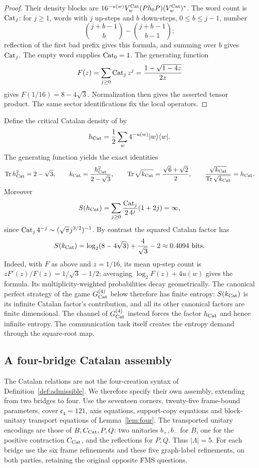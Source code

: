 \begin{proof}
Their density blocks are $16^{-u(w)}V_w^{\rm Cat}(Ph_0P)(V_w^{\rm Cat})^*$. The word count is $\operatorname{Cat}_j$: for $j\geq1$, words with $j$ up-steps and $b$ down-steps, $0\leq b\leq j-1$, number
\[
 \binom{j+b-1}{b}-\binom{j+b-1}{b-1};
\]
reflection of the first bad prefix gives this formula, and summing over $b$ gives $\operatorname{Cat}_j$. The empty word supplies $\operatorname{Cat}_0=1$. The generating function
\[
 F(z)=\sum_{j\geq0}\operatorname{Cat}_jz^j=\frac{1-\sqrt{1-4z}}{2z}
\]
gives $F(1/16)=8-4\sqrt3$. Normalization then gives the asserted tensor product. The same sector identifications fix the local operators.
\end{proof}

Define the critical Catalan density of \cite{Entropy} by
\[
 h_{\mathrm{Cat}}=\frac12\sum_w4^{-u(w)}|w\rangle\langle w|.
\]
The generating function yields the exact identities
\begin{equation}\label{eq:Catnumbers}
 \operatorname{Tr}h_{\mathrm{Cat}}^2=2-\sqrt3,\qquad
 k_{\mathrm{Cat}}=\frac{h_{\mathrm{Cat}}^2}{2-\sqrt3},\qquad
 \operatorname{Tr}\sqrt{k_{\mathrm{Cat}}}=\frac{\sqrt6+\sqrt2}{2},\qquad
 \frac{\sqrt{k_{\mathrm{Cat}}}}{\operatorname{Tr}\sqrt{k_{\mathrm{Cat}}}}=h_{\mathrm{Cat}}.
\end{equation}
Moreover
\begin{equation}\label{eq:Catentropy}
 S(h_{\mathrm{Cat}})=\sum_{j\geq0}\frac{\operatorname{Cat}_j}{2\,4^j}(1+2j)=\infty,
\end{equation}
since $\operatorname{Cat}_j4^{-j}\sim(\sqrt\pi j^{3/2})^{-1}$. By contrast the squared Catalan factor has
\[
 S(k_{\mathrm{Cat}})=\log_2(8-4\sqrt3)+\frac4{\sqrt3}-2
 \approx0.4094\ \text{bits}.
\]
Indeed, with $F$ as above and $z=1/16$, its mean up-step count is $zF'(z)/F(z)=1/\sqrt3-1/2$; averaging $\log_2 F(z)+4u(w)$ gives the formula. Its multiplicity-weighted probabilities decay geometrically. The canonical perfect strategy of the game $G^{(4)}_{\operatorname{Cat}}$ below therefore has finite entropy: $S(k_{\mathrm{Cat}})$ is its infinite Catalan factor's contribution, and all its other canonical factors are finite dimensional. The channel of $G^{(4)}_{\operatorname{Cat}}$ instead forces the factor $h_{\mathrm{Cat}}$ and hence infinite entropy. The communication task itself creates the entropy demand through the square-root map.

\subsection{A four-bridge Catalan assembly}
The Catalan relations are not the four-creation syntax of Definition~\ref{def:admissible}. We therefore specify their own assembly, extending \cite[Section~6]{Entropy} from two bridges to four. Use the seventeen corners, twenty-five frame-bound parameters, cover $\mathfrak c_4=121$, axis equations, support-copy equations and block-unitary transport equations of Lemma~\ref{lem:four}. The transported unitary encodings are those of $B,C_{\mathrm{Cat}},P,Q$: two unitaries $b_+,b_-$ for $B$, one for the positive contraction $C_{\mathrm{Cat}}$, and the reflections for $P,Q$. Thus $|\Lambda|=5$. For each bridge use the six frame refinements and these five graph-label refinements, on both parties, retaining the original opposite FMS questions.

